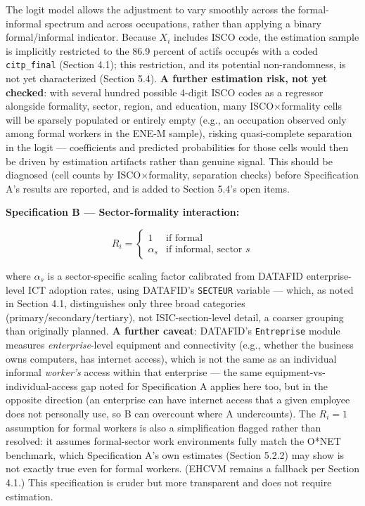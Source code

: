 \documentclass[
  11pt,
]{article}
\begin{document}
The logit model allows the adjustment to vary smoothly across the
formal-informal spectrum and across occupations, rather than applying a
binary formal/informal indicator. Because \(X_i\) includes ISCO code,
the estimation sample is implicitly restricted to the 86.9 percent of
actifs occupés with a coded \texttt{citp\_final} (Section 4.1); this
restriction, and its potential non-randomness, is not yet characterized
(Section 5.4). \textbf{A further estimation risk, not yet checked}: with
several hundred possible 4-digit ISCO codes as a regressor alongside
formality, sector, region, and education, many ISCO×formality cells will
be sparsely populated or entirely empty (e.g., an occupation observed
only among formal workers in the ENE-M sample), risking quasi-complete
separation in the logit --- coefficients and predicted probabilities for
those cells would then be driven by estimation artifacts rather than
genuine signal. This should be diagnosed (cell counts by ISCO×formality,
separation checks) before Specification A's results are reported, and is
added to Section 5.4's open items.

\textbf{Specification B --- Sector-formality interaction:}

\[R_i = \begin{cases} 1 & \text{if formal} \\ \alpha_s & \text{if informal, sector } s \end{cases}\]

where \(\alpha_s\) is a sector-specific scaling factor calibrated from
DATAFID enterprise-level ICT adoption rates, using DATAFID's
\texttt{SECTEUR} variable --- which, as noted in Section 4.1,
distinguishes only three broad categories (primary/secondary/tertiary),
not ISIC-section-level detail, a coarser grouping than originally
planned. \textbf{A further caveat}: DATAFID's \texttt{Entreprise} module
measures \emph{enterprise}-level equipment and connectivity (e.g.,
whether the business owns computers, has internet access), which is not
the same as an individual informal \emph{worker's} access within that
enterprise --- the same equipment-vs-individual-access gap noted for
Specification A applies here too, but in the opposite direction (an
enterprise can have internet access that a given employee does not
personally use, so B can overcount where A undercounts). The \(R_i = 1\)
assumption for formal workers is also a simplification flagged rather
than resolved: it assumes formal-sector work environments fully match
the O*NET benchmark, which Specification A's own estimates (Section
5.2.2) may show is not exactly true even for formal workers. (EHCVM
remains a fallback per Section 4.1.) This specification is cruder but
more transparent and does not require estimation.
\end{document}
